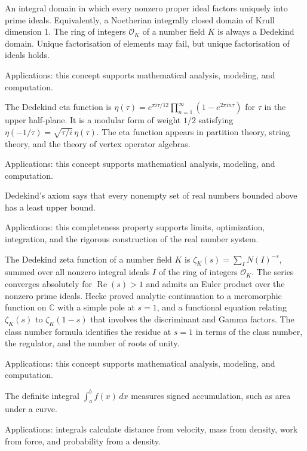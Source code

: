 An integral domain in which every nonzero proper ideal factors uniquely into prime ideals. Equivalently, a Noetherian integrally closed domain of Krull dimension 1. The ring of integers $\mathcal{O}_K$ of a number field $K$ is always a Dedekind domain. Unique factorisation of elements may fail, but unique factorisation of ideals holds. \par\noindent Applications: this concept supports mathematical analysis, modeling, and computation.

The Dedekind eta function is $\eta(\tau) = e^{\pi i \tau/12} \prod_{n=1}^{\infty}(1 - e^{2\pi i n \tau})$ for $\tau$ in the upper half-plane. It is a modular form of weight $1/2$ satisfying $\eta(-1/\tau) = \sqrt{\tau/i}\,\eta(\tau)$. The eta function appears in partition theory, string theory, and the theory of vertex operator algebras. \par\noindent Applications: this concept supports mathematical analysis, modeling, and computation.

Dedekind's axiom says that every nonempty set of real numbers bounded above has a least upper bound. \par\noindent Applications: this completeness property supports limits, optimization, integration, and the rigorous construction of the real number system.

The Dedekind zeta function of a number field $K$ is $\zeta_K(s) = \sum_I N(I)^{-s}$, summed over all nonzero integral ideals $I$ of the ring of integers $\mathcal{O}_K$. The series converges absolutely for $\operatorname{Re}(s) > 1$ and admits an Euler product over the nonzero prime ideals. Hecke proved analytic continuation to a meromorphic function on $\mathbb{C}$ with a simple pole at $s = 1$, and a functional equation relating $\zeta_K(s)$ to $\zeta_K(1-s)$ that involves the discriminant and Gamma factors. The class number formula identifies the residue at $s = 1$ in terms of the class number, the regulator, and the number of roots of unity. \par\noindent Applications: this concept supports mathematical analysis, modeling, and computation.

The definite integral $\int_a^b f(x)\,dx$ measures signed accumulation, such as area under a curve. \par\noindent Applications: integrals calculate distance from velocity, mass from density, work from force, and probability from a density.

